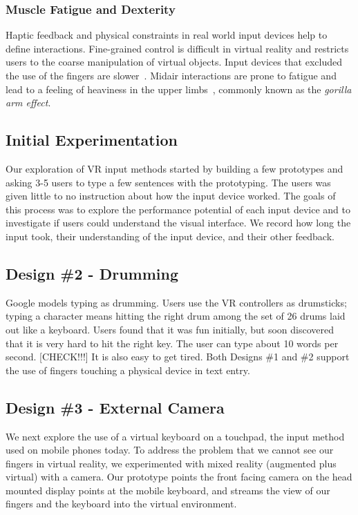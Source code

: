 \subsubsection{Muscle Fatigue and Dexterity}

Haptic feedback and physical constraints in real world input devices help to define interactions. 
Fine-grained control is difficult in virtual reality and restricts users to the coarse manipulation of virtual objects.
Input devices that excluded the use of the fingers are slower~\cite{Zhai:1996:IMG:238386.238534}.  
Midair interactions are prone to fatigue and lead to a feeling
of heaviness in the upper limbs~\cite{Hincapie-Ramos:2014:CEM:2556288.2557130}, commonly known as the \textit{gorilla arm effect}.

\subsection{Initial Experimentation}

Our exploration of VR input methods started by building a few prototypes and asking 3-5 users to type a few sentences with the prototyping.  
The users was given little to no instruction about how the input device worked.
The goals of this process was to explore the performance potential of each input device and to investigate if users could understand the visual interface.
We record how long the input took, their understanding of the input device, and their other feedback.


\subsection{Design \#2 - Drumming}
Google models typing as drumming.  Users use the VR controllers as drumsticks; typing a character means hitting the right drum among the set of 26 drums laid out like a keyboard. Users found that it was fun initially, but soon discovered that it is very hard to hit the right key.   The user can type about 10 words per second. [CHECK!!!]
It is also easy to get tired. 
Both Designs \#1 and \#2 support the use of fingers touching a physical device in text entry. 

\subsection{Design \#3 - External Camera}

We next explore the use of a virtual keyboard on a touchpad, the input method used on mobile phones today.  To address the problem that we cannot see our fingers in virtual reality, we experimented with mixed reality (augmented plus virtual) with a camera.  Our prototype points the front facing camera on the head mounted display points at the mobile keyboard, and streams the view of our fingers and the keyboard into the virtual environment. 

